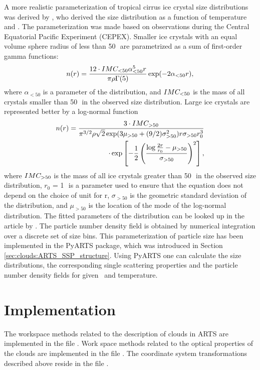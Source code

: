 A more realistic parameterization of tropical cirrus ice crystal size
distributions was derived by
\citet{mcfarquar97:_param_tropic_cirrus_ice_cryst}, who derived the
size distribution as a function of temperature and \imc. The
parameterization was made based on observations during the Central
Equatorial Pacific Experiment (CEPEX). Smaller ice crystals with an
equal volume sphere radius of less than 50\,\mum\ are parametrized
as a sum of first-order gamma functions:
\begin{equation}
  \label{eq:MH_gamma}
  n(r) = \frac{12\cdot IMC_{<50}\alpha^5_{<50} r}{\pi \rho
    \Gamma(5)} \exp(-2 \alpha_{<50} r), 
\end{equation}
where $\alpha_{<50}$ is a parameter of the distribution, and
$IMC_{<50}$ is the mass of all crystals smaller than 50\,\mum\ in
the observed size distribution.  Large ice crystals are represented
better by a log-normal function
\begin{eqnarray}
  \label{eq:MH_lognorm}
  n(r) = \frac{3\cdot IMC_{>50}}{\pi^{3/2}\rho \sqrt{2}
    \exp(3\mu_{>50}+(9/2)\sigma^2_{>50}) r \sigma_{>50} r_0^3}
  \nonumber \\
  \cdot \exp\left[-\frac{1}{2}\left(\frac{\log\frac{2r}{r_0} -
          \mu_{>50}}{\sigma_{>50}}\right)^2\right], 
\end{eqnarray}
where $IMC_{>50}$ is the mass of all ice crystals greater than
50\,\mum\ in the observed size distribution, $r_0$ = 1\,\mum\ is a
parameter used to ensure that the equation does not depend on the
choice of unit for r, $\sigma_{>50}$ is the geometric standard
deviation of the distribution, and $\mu_{>50}$ is the location of the
mode of the log-normal distribution.  The fitted parameters of the
distribution can be looked up in the article by
\citet{mcfarquar97:_param_tropic_cirrus_ice_cryst}.  The particle
number density field is obtained by numerical integration over a
discrete set of size bins. This parameterization of particle size has
been implemented in the PyARTS package, which was introduced in
Section \ref{sec:clouds:ARTS_SSP_structure}. Using PyARTS one can calculate the size
distributions, the corresponding single scattering properties and the
particle number density fields for given \imc\ and temperature.


\section{Implementation}
\label{sec:clouds:implement}

The workspace methods related to the description of clouds in ARTS are
implemented in the file .
Work space methods related to the optical properties of the clouds are
implemented in the file . The coordinate system
transformations described above reside in the file
.

